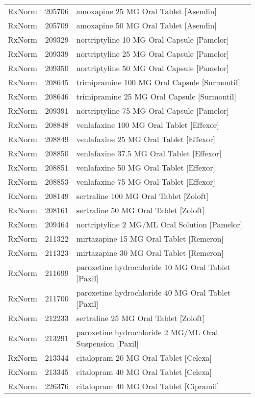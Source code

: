 \begin{longtable}{p{}p{}p{}}
  RxNorm & 205706 & amoxapine 25 MG Oral Tablet [Asendin] \\ 
  RxNorm & 205709 & amoxapine 50 MG Oral Tablet [Asendin] \\ 
  RxNorm & 209329 & nortriptyline 10 MG Oral Capsule [Pamelor] \\ 
  RxNorm & 209339 & nortriptyline 25 MG Oral Capsule [Pamelor] \\ 
  RxNorm & 209350 & nortriptyline 50 MG Oral Capsule [Pamelor] \\ 
  RxNorm & 208645 & trimipramine 100 MG Oral Capsule [Surmontil] \\ 
  RxNorm & 208646 & trimipramine 25 MG Oral Capsule [Surmontil] \\ 
  RxNorm & 209391 & nortriptyline 75 MG Oral Capsule [Pamelor] \\ 
  RxNorm & 208848 & venlafaxine 100 MG Oral Tablet [Effexor] \\ 
  RxNorm & 208849 & venlafaxine 25 MG Oral Tablet [Effexor] \\ 
  RxNorm & 208850 & venlafaxine 37.5 MG Oral Tablet [Effexor] \\ 
  RxNorm & 208851 & venlafaxine 50 MG Oral Tablet [Effexor] \\ 
  RxNorm & 208853 & venlafaxine 75 MG Oral Tablet [Effexor] \\ 
  RxNorm & 208149 & sertraline 100 MG Oral Tablet [Zoloft] \\ 
  RxNorm & 208161 & sertraline 50 MG Oral Tablet [Zoloft] \\ 
  RxNorm & 209464 & nortriptyline 2 MG/ML Oral Solution [Pamelor] \\ 
  RxNorm & 211322 & mirtazapine 15 MG Oral Tablet [Remeron] \\ 
  RxNorm & 211323 & mirtazapine 30 MG Oral Tablet [Remeron] \\ 
  RxNorm & 211699 & paroxetine hydrochloride 10 MG Oral Tablet [Paxil] \\ 
  RxNorm & 211700 & paroxetine hydrochloride 40 MG Oral Tablet [Paxil] \\ 
  RxNorm & 212233 & sertraline 25 MG Oral Tablet [Zoloft] \\ 
  RxNorm & 213291 & paroxetine hydrochloride 2 MG/ML Oral Suspension [Paxil] \\ 
  RxNorm & 213344 & citalopram 20 MG Oral Tablet [Celexa] \\ 
  RxNorm & 213345 & citalopram 40 MG Oral Tablet [Celexa] \\ 
  RxNorm & 226376 & citalopram 40 MG Oral Tablet [Cipramil] \\ 

\end{longtable}

